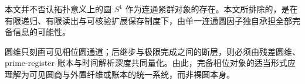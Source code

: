 \begin{remark}[完备相位对象的结论性表述]\label{rem:conclusion-complete-phase-object-not-bare-circle}
本文并不否认拓扑意义上的圆 \(S^1\) 作为连通紧群对象的存在。本文所排除的，是在有限递归、有限读出与可核验扩展保存制度下，由单一连通圆因子独自承担全部完备信息的可能性。
\par
圆维只刻画可见相位圆通道；后继步与极限完成之间的断层，则必须由残差圆维、prime-register 账本与时间解析深度共同量化。由此，完备相位对象的适当形式应理解为可见圆商与外置纤维或账本的统一系统，而非裸圆本身。
\end{remark}
